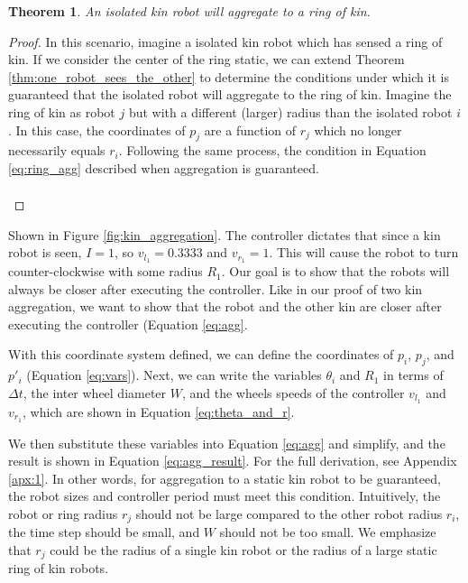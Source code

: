 \documentclass[conference]{IEEEtran}
\newtheorem{theorem}{Theorem}
\begin{document}
    \begin{theorem} \label{thm:aggregation_with_ring_of_kin}
      An isolated kin robot will aggregate to a ring of kin.
    \end{theorem}
    \begin{proof}

      In this scenario, imagine a isolated kin robot which has sensed a ring of kin. If we consider the center of the ring static, we can extend Theorem \ref{thm:one_robot_sees_the_other} to determine the conditions under which it is guaranteed that the isolated robot will aggregate to the ring of kin. Imagine the ring of kin as robot $j$ but with a different (larger) radius than the isolated robot $i$. In this case, the coordinates of $p_j$ are a function of $r_j$ which no longer necessarily equals $r_i$. Following the same process, the condition in Equation \eqref{eq:ring_agg} described when aggregation is guaranteed.

      \begin{equation} \label{eq:ring_agg}
        \begin{split}
        \end{split}
      \end{equation}

      \end{proof}

     Shown in Figure \ref{fig:kin_aggregation}. The controller dictates that since a kin robot is seen, $I=1$, so $v_{l_1} = 0.3333$ and $v_{r_1} = 1$. This will cause the robot to turn counter-clockwise with some radius $R_1$. Our goal is to show that the robots will always be closer after executing the controller. Like in our proof of two kin aggregation, we want to show that the robot and the other kin are closer after executing the controller (Equation \eqref{eq:agg}.

    With this coordinate system defined, we can define the coordinates of $p_i$, $p_j$, and $p'_i$ (Equation \eqref{eq:vars}). Next, we can write the variables $\theta_i$ and $R_1$ in terms of $\Delta t$, the inter wheel diameter $W$, and the wheels speeds of the controller $v_{l_1}$ and $v_{r_1}$, which are shown in Equation \eqref{eq:theta_and_r}.

    We then substitute these variables into Equation \eqref{eq:agg} and simplify, and the result is shown in Equation \eqref{eq:agg_result}. For the full derivation, see Appendix \ref{apx:1}. In other words, for aggregation to a static kin robot to be guaranteed, the robot sizes and controller period must meet this condition. Intuitively, the robot or ring radius $r_j$ should not be large compared to the other robot radius $r_i$, the time step should be small, and $W$ should not be too small. We emphasize that $r_j$ could be the radius of a single kin robot or the radius of a large static ring of kin robots.
\end{document}

